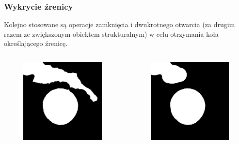 \documentclass{beamer}
\begin{document}
\begin{frame}
\frametitle{Wykrycie źrenicy}
Kolejno stosowane są operacje zamknięcia i dwukrotnego otwarcia (za drugim razem ze zwiększonym obiektem strukturalnym) w celu otrzymania koła określającego źrenicę.
\begin{columns}
		\begin{figure}
		\begin{center}
		\includegraphics[scale=0.25]{zamkniecie.jpg}
		\end{center}
		\end{figure}
		\begin{figure}
		\begin{center}
		\includegraphics[scale=0.25]{otwarcie1.jpg}

\end{center}
\end{figure}
\end{columns}
\end{frame}
\end{document}
